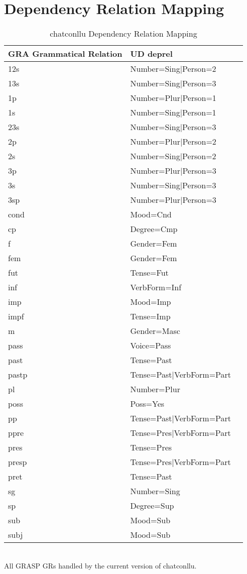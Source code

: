 \newpage
\section{Dependency Relation Mapping}
\begin{table}[h!]
\caption {chatconllu Dependency Relation Mapping} \label{tab:grmap}
\centering
\begin{tabularx}{\linewidth}{@{}lXl@{}}
\toprule
\textbf{GRA Grammatical Relation} & \textbf{UD deprel}\\ \midrule
	12s & Number=Sing|Person=2\\
	13s & Number=Sing|Person=3\\
	1p & Number=Plur|Person=1\\
	1s & Number=Sing|Person=1\\
	23s & Number=Sing|Person=3\\
	2p & Number=Plur|Person=2\\
	2s & Number=Sing|Person=2\\
	3p & Number=Plur|Person=3\\
	3s & Number=Sing|Person=3\\
	3sp & Number=Plur|Person=3\\
	cond & Mood=Cnd\\
	cp & Degree=Cmp\\
	f & Gender=Fem\\
	fem & Gender=Fem\\
	fut & Tense=Fut\\
	inf & VerbForm=Inf\\
	imp & Mood=Imp\\
	impf & Tense=Imp\\
	m & Gender=Masc\\
	pass & Voice=Pass\\
	past & Tense=Past\\
	pastp & Tense=Past|VerbForm=Part\\
	pl & Number=Plur\\
	poss & Poss=Yes\\
	pp & Tense=Past|VerbForm=Part\\
	ppre & Tense=Pres|VerbForm=Part\\
	pres & Tense=Pres\\
	presp & Tense=Pres|VerbForm=Part\\
	pret & Tense=Past\\
	sg & Number=Sing\\
	sp & Degree=Sup\\
	sub & Mood=Sub\\
	subj & Mood=Sub\\\bottomrule
\end{tabularx}\\
\vspace{0.5cm}
All GRASP GRs handled by the current version of chatconllu.\\
\end{table}
